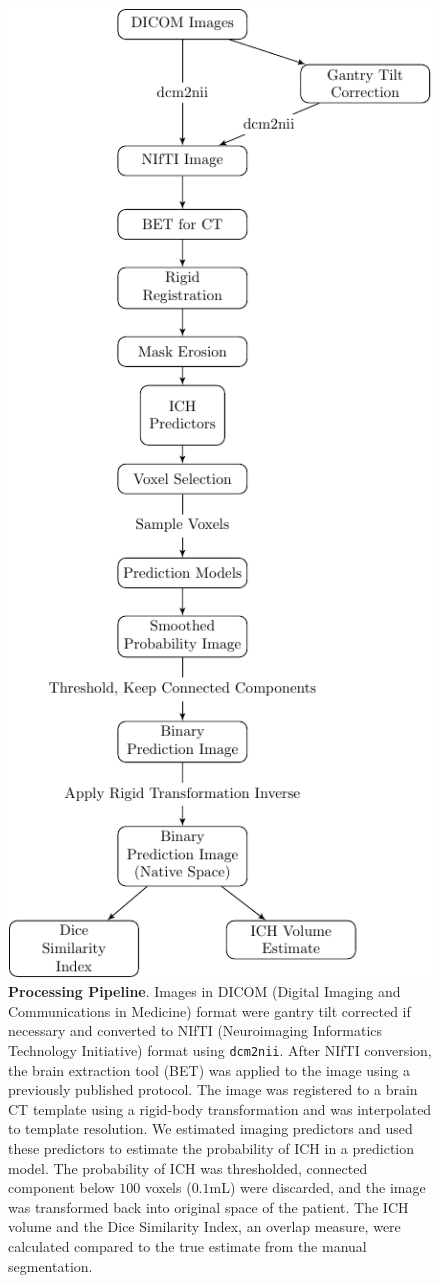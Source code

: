 \documentclass{elsarticle_nonatbib}\usepackage[]{graphicx}\usepackage[]{color}
\begin{document}


\begin{figure}
\centering
\includegraphics[width=0.5\linewidth]{Imaging_Pipeline_Flowchart_with_Rigid.pdf}
\caption{{\bf Processing Pipeline}.  Images in DICOM (Digital Imaging and Communications in Medicine) format were gantry tilt corrected if necessary and converted to NIfTI (Neuroimaging Informatics Technology Initiative) format using \texttt{dcm2nii}.  After NIfTI conversion, the brain extraction tool (BET) was applied to the image using a previously published protocol.  The image was registered to a brain CT template using a rigid-body transformation and was interpolated to template resolution.  We estimated imaging predictors and used these predictors to estimate the probability of ICH in a prediction model.  The probability of ICH was thresholded, connected component below $100$ voxels ($0.1$mL) were discarded, and the image was transformed back into original space of the patient.  The ICH volume and the Dice Similarity Index, an overlap measure, were calculated compared to the true estimate from the manual segmentation.  }

\end{figure}
\end{document}
